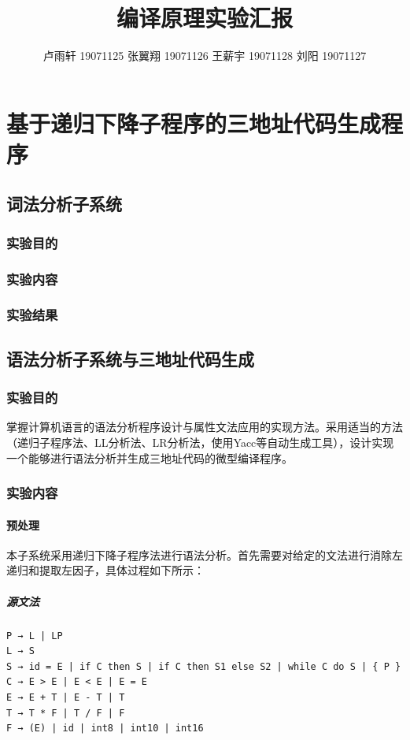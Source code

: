 \documentclass{ctexrep}
\title{编译原理实验汇报}
\author{卢雨轩 19071125 张翼翔 19071126 王薪宇 19071128 刘阳 19071127}
\begin{document}
\maketitle

\tableofcontents

\chapter{基于递归下降子程序的三地址代码生成程序}
\section{词法分析子系统}
\subsection{实验目的}
\subsection{实验内容}
\subsection{实验结果}
\section{语法分析子系统与三地址代码生成}
\subsection{实验目的}
掌握计算机语言的语法分析程序设计与属性文法应用的实现方法。采用适当的方法（递归子程序法、LL分析法、LR分析法，使用Yacc等自动生成工具），设计实现一个能够进行语法分析并生成三地址代码的微型编译程序。
\subsection{实验内容}
\subsubsection{预处理}
本子系统采用递归下降子程序法进行语法分析。首先需要对给定的文法进行消除左递归和提取左因子，具体过程如下所示：
\paragraph{源文法}
\begin{verbatim}
P → L | LP
L → S 
S → id = E | if C then S | if C then S1 else S2 | while C do S | { P }
C → E > E | E < E | E = E
E → E + T | E - T | T
T → T * F | T / F | F
F → (E) | id | int8 | int10 | int16    
\end{verbatim}
\end{document}
